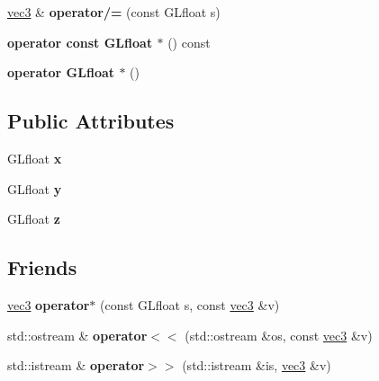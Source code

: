 \begin{DoxyCompactItemize}
\item 
\hypertarget{struct_angel_1_1vec3_ae3ac03ba1ce7c8bbb8dfe07c7e0d06d9}{\hyperlink{struct_angel_1_1vec3}{vec3} \& {\bfseries operator/=} (const G\-Lfloat s)}\label{struct_angel_1_1vec3_ae3ac03ba1ce7c8bbb8dfe07c7e0d06d9}

\item 
\hypertarget{struct_angel_1_1vec3_a81f4a99d68722e756664907dcb07fb92}{{\bfseries operator const G\-Lfloat $\ast$} () const }\label{struct_angel_1_1vec3_a81f4a99d68722e756664907dcb07fb92}

\item 
\hypertarget{struct_angel_1_1vec3_ab92761f9bc4454117c1dd39a7d87c1b0}{{\bfseries operator G\-Lfloat $\ast$} ()}\label{struct_angel_1_1vec3_ab92761f9bc4454117c1dd39a7d87c1b0}

\end{DoxyCompactItemize}
\subsection*{Public Attributes}
\begin{DoxyCompactItemize}
\item 
\hypertarget{struct_angel_1_1vec3_a758dbe298cc37615770c30a73066253d}{G\-Lfloat {\bfseries x}}\label{struct_angel_1_1vec3_a758dbe298cc37615770c30a73066253d}

\item 
\hypertarget{struct_angel_1_1vec3_a02608203e694798c3118d5b55a0e0048}{G\-Lfloat {\bfseries y}}\label{struct_angel_1_1vec3_a02608203e694798c3118d5b55a0e0048}

\item 
\hypertarget{struct_angel_1_1vec3_afa2e7231c4170ddedb556ef5f7941cbc}{G\-Lfloat {\bfseries z}}\label{struct_angel_1_1vec3_afa2e7231c4170ddedb556ef5f7941cbc}

\end{DoxyCompactItemize}
\subsection*{Friends}
\begin{DoxyCompactItemize}
\item 
\hypertarget{struct_angel_1_1vec3_a1d78982e3d5969f2e9f98a536cfea9f7}{\hyperlink{struct_angel_1_1vec3}{vec3} {\bfseries operator$\ast$} (const G\-Lfloat s, const \hyperlink{struct_angel_1_1vec3}{vec3} \&v)}\label{struct_angel_1_1vec3_a1d78982e3d5969f2e9f98a536cfea9f7}

\item 
\hypertarget{struct_angel_1_1vec3_a3e8f4856b29a4320f185f9a9cf0f94bc}{std\-::ostream \& {\bfseries operator$<$$<$} (std\-::ostream \&os, const \hyperlink{struct_angel_1_1vec3}{vec3} \&v)}\label{struct_angel_1_1vec3_a3e8f4856b29a4320f185f9a9cf0f94bc}

\item 
\hypertarget{struct_angel_1_1vec3_ab705d3337286a4262e84bbbb0b694a56}{std\-::istream \& {\bfseries operator$>$$>$} (std\-::istream \&is, \hyperlink{struct_angel_1_1vec3}{vec3} \&v)}\label{struct_angel_1_1vec3_ab705d3337286a4262e84bbbb0b694a56}

\end{DoxyCompactItemize}



